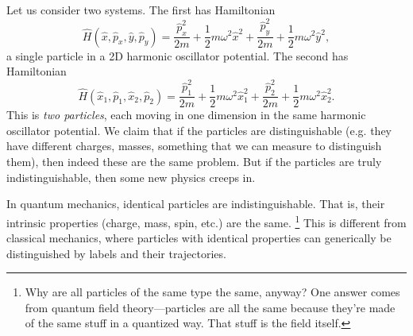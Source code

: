 Let us consider two systems. The first has Hamiltonian
\begin{equation}
    \hat H(\hat x,\hat p_x, \hat y, \hat p_y) = \frac{\hat p_x^2}{2m} + \frac{1}{2} m \omega^2 \hat x^2 + \frac{\hat p_y^2}{2m} + \frac{1}{2}m \omega^2 \hat y^2,
\end{equation}
a single particle in a 2D harmonic oscillator potential. The second has Hamiltonian
\begin{equation}
    \hat H(\hat x_1,\hat p_1, \hat x_2, \hat p_2) = \frac{\hat p_1^2}{2m} + \frac{1}{2} m \omega^2 \hat x_1^2 + \frac{\hat p_2^2}{2m} + \frac{1}{2}m \omega^2 \hat x_2^2.
\end{equation}
This is \emph{two particles}, each moving in one dimension in the same harmonic oscillator potential.
We claim that if the particles are distinguishable (e.g. they have different charges, masses, something that we can measure to distinguish them), then indeed these are the same problem. But if the particles are truly indistinguishable, then some new physics creeps in.

In quantum mechanics, identical particles are indistinguishable. That is, their intrinsic properties (charge, mass, spin, etc.) are the same.%
    \footnote{Why are all particles of the same type the same, anyway? One answer comes from quantum field theory---particles are all the same because they're made of the same stuff in a quantized way. That stuff is the field itself.}
This is different from classical mechanics, where particles with identical properties can generically be distinguished by labels and their trajectories.

